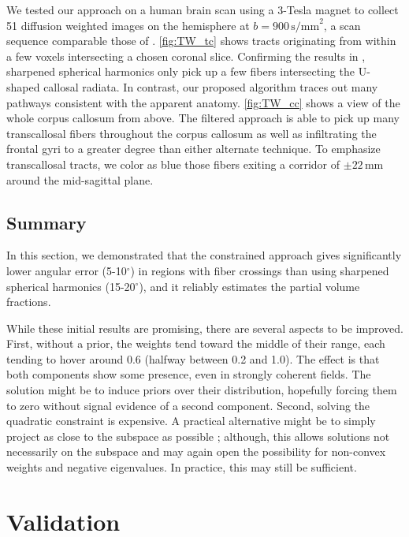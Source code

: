 \documentclass[final,hyperref]{gatech-thesis}
\renewcommand{\deg}{\ensuremath{^\circ}\xspace}
\begin{document}
We tested our approach on a human brain scan using a 3-Tesla magnet to collect
51 diffusion weighted images on the hemisphere at $b=900\,\text{s/mm}^2$, a
scan sequence comparable those of \cite{Descoteaux2007,Schultz2008}.
%
\autoref{fig:TW_tc} shows tracts originating from within a few voxels
intersecting a chosen coronal slice.  Confirming the results in
\cite{Descoteaux2007,Schultz2008}, sharpened spherical harmonics only pick up
a few fibers intersecting the U-shaped callosal radiata.  In contrast, our
proposed algorithm traces out many pathways consistent with the apparent
anatomy.  \autoref{fig:TW_cc} shows a view of the whole corpus callosum from
above.  The filtered approach is able to pick up many transcallosal fibers
throughout the corpus callosum as well as infiltrating the frontal gyri to a
greater degree than either alternate technique.  To emphasize transcallosal
tracts, we color as blue those fibers exiting a corridor of $\pm
22\,\text{mm}$ around the mid-sagittal plane.

\section{Summary}

In this section, we demonstrated that the constrained approach gives
significantly lower angular error (5-10\deg) in regions with fiber crossings
than using sharpened spherical harmonics (15-20\deg), and it reliably
estimates the partial volume fractions.

While these initial results are promising, there are several aspects to be
improved.
%
First, without a prior, the weights tend toward the middle of their range,
each tending to hover around 0.6 (halfway between 0.2 and 1.0).  The effect is
that both components show some presence, even in strongly coherent fields.
The solution might be to induce priors over their distribution, hopefully
forcing them to zero without signal evidence of a second component.
%
Second, solving the quadratic constraint is expensive.  A practical
alternative might be to simply project as close to the subspace as possible
\cite{Simon2006}; although, this allows solutions not necessarily on the
subspace and may again open the possibility for non-convex weights and
negative eigenvalues.  In practice, this may still be sufficient.




\chapter{Validation}
\end{document}
